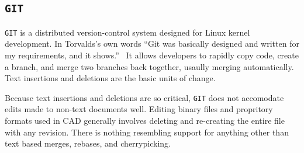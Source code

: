 \documentclass[sigconf,]{acmart}
\begin{document}
\subsection{\texttt{GIT}}



\texttt{GIT} is a distributed version-control system designed for Linux kernel development.
In Torvalds's own words ``Git was basically designed and written for my requirements, and it shows.''~\cite{https://www.linuxfoundation.org/blog/blog/10-years-of-git-an-interview-with-git-creator-linus-torvalds}
It allows developers to rapidly copy code, create a branch, and merge two branches back together, usaully merging automatically.
Text insertions and deletions are the basic units of change.


Because text insertions and deletions are so critical, \texttt{GIT} does not accomodate edits made to non-text documents well.
Editing binary files and propritory formats used in CAD generally involves deleting and re-creating the entire file with any revision.
There is nothing resembling support for anything other than text based merges, rebases, and cherrypicking.




\end{document}
